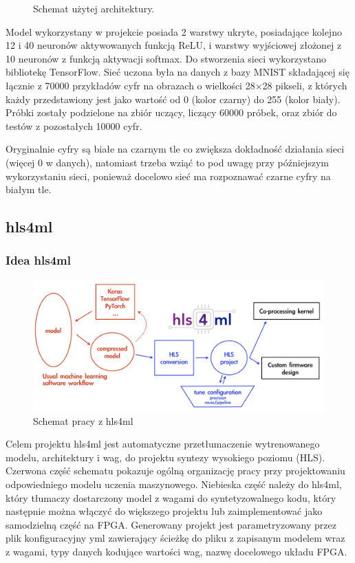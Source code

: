 \documentclass[12pt, oneside, a4paper]{article}
\begin{document}
\begin{figure}[h]
  \centering
  
  \caption{Schemat użytej architektury.
  }\label{fig:nn-scheme}
\end{figure}
Model wykorzystany w projekcie posiada 2 warstwy ukryte, posiadające kolejno
12 i 40 neuronów aktywowanych funkcją ReLU, i warstwy wyjściowej złożonej
z 10 neuronów z funkcją aktywacji softmax. Do stworzenia sieci wykorzystano
bibliotekę TensorFlow. Sieć uczona była na danych
z bazy MNIST składającej się łącznie z 70000 przykładów
cyfr na obrazach o wielkości 28\(\times \)28 pikseli, z których każdy
przedstawiony jest jako wartość od 0 (kolor czarny) do 255 (kolor biały).
Próbki zostały
podzielone na zbiór uczący, liczący 60000 próbek, oraz zbiór do testów
z pozostałych 10000 cyfr.

Oryginalnie cyfry są białe na czarnym tle co zwiększa
 dokładność działania sieci (więcej 0 w danych),
natomiast trzeba wziąć to pod uwagę przy późniejszym wykorzystaniu sieci,
ponieważ docelowo sieć ma rozpoznawać czarne cyfry na białym tle.

\subsection{hls4ml}
\subsubsection{Idea hls4ml}
\begin{figure}[h]
  \centering
  \includegraphics[scale=0.2]{figures/hls4ml.jpg}
  \caption{Schemat pracy z hls4ml}\label{fig:hls4ml}
\end{figure}
Celem projektu hls4ml jest automatyczne przetłumaczenie wytrenowanego modelu,
architektury i wag, do projektu syntezy wysokiego poziomu (HLS).
Czerwona część schematu pokazuje ogólną organizację pracy przy projektowaniu 
odpowiedniego modelu uczenia maszynowego. Niebieska część należy do hls4ml,
który tłumaczy dostarczony model z wagami do syntetyzowalnego kodu, który
następnie można włączyć do większego projektu lub zaimplementować jako
samodzielną część na FPGA. Generowany projekt jest parametryzowany
przez plik konfiguracyjny yml zawierający ścieżkę do pliku z zapisanym modelem
wraz z wagami, typy danych kodujące wartości wag, nazwę docelowego układu FPGA.
\end{document}
